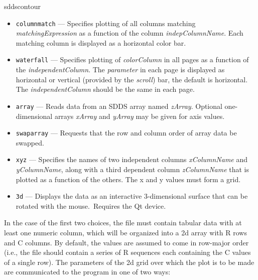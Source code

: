 \begin{sddsprog}{sddscontour}
\begin{itemize}
\begin{itemize}
        \item \verb|columnmatch| --- Specifies plotting of all columns matching {\em matchingExpression}
        as a function of the column {\em indepColumnName}.  Each matching column is displayed as a horizontal
        color bar.
        \item \verb|waterfall| --- Specifies plotting of {\em colorColumn} in all pages as a function of the
        {\em independentColumn}. The {\em parameter} in each page is displayed as horizontal or vertical (provided
        by the {\em scroll}) bar, the default is horizontal. The {\em independentColumn} should be the same in
        each page.
        \item \verb|array| --- Reads data from an SDDS array named {\em zArray}.  Optional one-dimensional arrays
          {\em xArray} and {\em yArray} may be given for axis values.
        \item \verb|swaparray| --- Requests that the row and column order of array data be swapped.
        \item \verb|xyz| --- Specifies the names of two independent columns {\em xColumnName} and {\em yColumnName}, along with
          a third dependent column {\em zColumnName} that is plotted as a function of the others.
          The x and y values must form a grid.
        \item \verb|3d| --- Displays the data as an interactive 3-dimensional surface that can be rotated with the mouse.\
          Requires the Qt device.
        \end{itemize}

        In the case of the first two choices, the file must contain
tabular data with at least one numeric column, which will be organized
into a 2d array with R rows and C columns.  By default, the values are
assumed to come in row-major order (i.e., the file should contain a
series of R sequences each containing the C values of a single row).
The parameters of the 2d grid over which the plot is to be made are
communicated to the program in one of two ways:

\begin{enumerate}


\end{enumerate}
\end{itemize}
\end{sddsprog}
